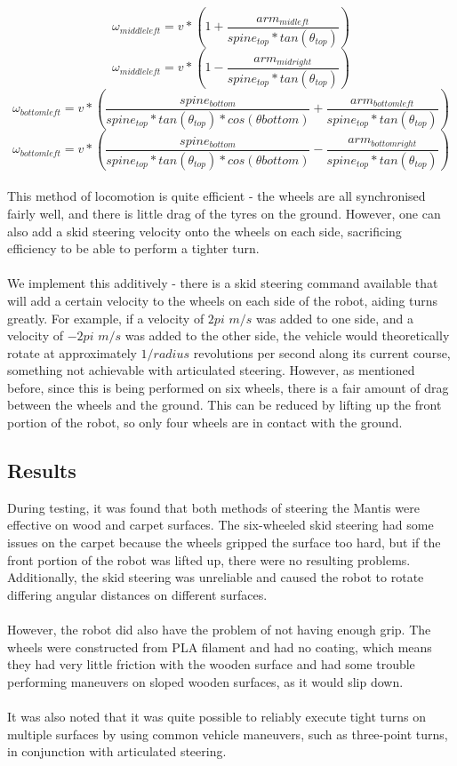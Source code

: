 \documentclass[]{article}
\begin{document}
\[ \omega_{middleleft} = v * (1 + \frac{arm_{midleft}}{spine_{top} * tan(\theta_{top})}) \]
\[ \omega_{middleleft} = v * (1 - \frac{arm_{midright}}{spine_{top} * tan(\theta_{top})}) \]
\[ \omega_{bottomleft} = v * (\frac{spine_{bottom}}{spine_{top} * tan(\theta_{top}) * cos(\theta{bottom})} + \frac{arm_{bottomleft}}{spine_{top} * tan(\theta_{top})}) \]
\[ \omega_{bottomleft} = v * (\frac{spine_{bottom}}{spine_{top} * tan(\theta_{top}) * cos(\theta{bottom})} - \frac{arm_{bottomright}}{spine_{top} * tan(\theta_{top})}) \]
\\
This method of locomotion is quite efficient - the wheels are all synchronised fairly well, and there is little drag of the tyres on the ground. However, one can also add a skid steering velocity onto the wheels on each side, sacrificing efficiency to be able to perform a tighter turn.
\\
\\
We implement this additively - there is a skid steering command available that will add a certain velocity to the wheels on each side of the robot, aiding turns greatly. For example, if a velocity of $2pi$ $m/s$ was added to one side, and a velocity of $-2pi$ $m/s$ was added to the other side, the vehicle would theoretically rotate at approximately $1 / radius$ revolutions per second along its current course, something not achievable with articulated steering. However, as mentioned before, since this is being performed on six wheels, there is a fair amount of drag between the wheels and the ground. This can be reduced by lifting up the front portion of the robot, so only four wheels are in contact with the ground.

\subsection{Results}
During testing, it was found that both methods of steering the Mantis were effective on wood and carpet surfaces. The six-wheeled skid steering had some issues on the carpet because the wheels gripped the surface too hard, but if the front portion of the robot was lifted up, there were no resulting problems. Additionally, the skid steering was unreliable and caused the robot to rotate differing angular distances on different surfaces.
\\
\\
However, the robot did also have the problem of not having enough grip. The wheels were constructed from PLA filament and had no coating, which means they had very little friction with the wooden surface and had some trouble performing maneuvers on sloped wooden surfaces, as it would slip down.
\\
\\
It was also noted that it was quite possible to reliably execute tight turns on multiple surfaces by using common vehicle maneuvers, such as three-point turns, in conjunction with articulated steering.
\end{document}
